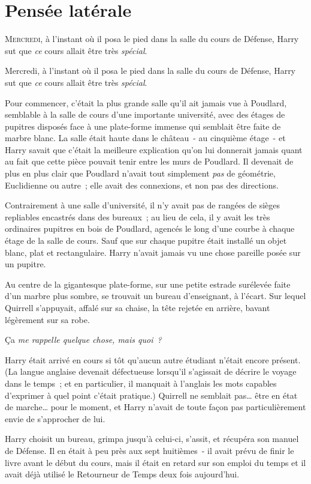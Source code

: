 \chapter{Pensée latérale}

\lettrine{M}{ercredi,} à l'instant où il posa le pied dans la salle du cours de Défense, Harry sut que \emph{ce} cours allait être très \emph{spécial}.

Mercredi, à l'instant où il posa le pied dans la salle du cours de Défense, Harry sut que \emph{ce} cours allait être très \emph{spécial}.

Pour commencer, c'était la plus grande salle qu'il ait jamais vue à Poudlard, semblable à la salle de cours d'une importante université, avec des étages de pupitres disposés face à une plate-forme immense qui semblait être faite de marbre blanc. La salle était haute dans le château~- au cinquième étage~- et Harry savait que c'était la meilleure explication qu'on lui donnerait jamais quant au fait que cette pièce pouvait tenir entre les murs de Poudlard. Il devenait de plus en plus clair que Poudlard n'avait tout simplement \emph{pas} de géométrie, Euclidienne ou autre~; elle avait des connexions, et non pas des directions.

Contrairement à une salle d'université, il n'y avait pas de rangées de sièges repliables encastrés dans des bureaux~; au lieu de cela, il y avait les très ordinaires pupitres en bois de Poudlard, agencés le long d'une courbe à chaque étage de la salle de cours. Sauf que sur chaque pupitre était installé un objet blanc, plat et rectangulaire. Harry n'avait jamais vu une chose pareille posée sur un pupitre.

Au centre de la gigantesque plate-forme, sur une petite estrade surélevée faite d'un marbre plus sombre, se trouvait un bureau d'enseignant, à l'écart. Sur lequel Quirrell s'appuyait, affalé sur sa chaise, la tête rejetée en arrière, bavant légèrement sur sa robe.

Ça \emph{me rappelle quelque chose, mais quoi~?}

Harry était arrivé en cours si tôt qu'aucun autre étudiant n'était encore présent. (La langue anglaise devenait défectueuse lorsqu'il s'agissait de décrire le voyage dans le temps~; et en particulier, il manquait à l'anglais les mots capables d'exprimer à quel point c'était pratique.) Quirrell ne semblait pas… être en état de marche… pour le moment, et Harry n'avait de toute façon pas particulièrement envie de s'approcher de lui.

Harry choisit un bureau, grimpa jusqu'à celui-ci, s'assit, et récupéra son manuel de Défense. Il en était à peu près aux sept huitièmes~- il avait prévu de finir le livre avant le début du cours, mais il était en retard sur son emploi du temps et il avait déjà utilisé le Retourneur de Temps deux fois aujourd'hui.

